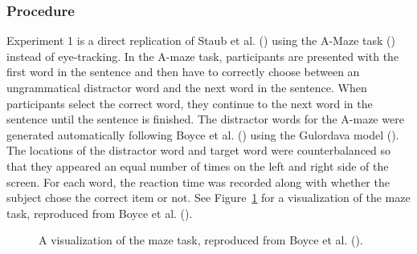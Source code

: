 \documentclass[
  12pt,
  letterpaper,
]{scrreport}
\begin{document}
\subsubsection{Procedure}\label{procedure}

Experiment 1 is a direct replication of Staub et al.
() using the A-Maze
task () instead
of eye-tracking. In the A-maze task, participants are presented with the
first word in the sentence and then have to correctly choose between an
ungrammatical distractor word and the next word in the sentence. When
participants select the correct word, they continue to the next word in
the sentence until the sentence is finished. The distractor words for
the A-maze were generated automatically following Boyce et al.
() using the Gulordava model
(). The locations of the distractor word and target word were
counterbalanced so that they appeared an equal number of times on the
left and right side of the screen. For each word, the reaction time was
recorded along with whether the subject chose the correct item or not.
See Figure~\ref{fig-mazevisualization} for a visualization of the maze
task, reproduced from Boyce et al.
().

\begin{figure}[htbp]

\caption{\label{fig-mazevisualization}A visualization of the maze task,
reproduced from Boyce et al.
().}


\end{figure}%
\end{document}
